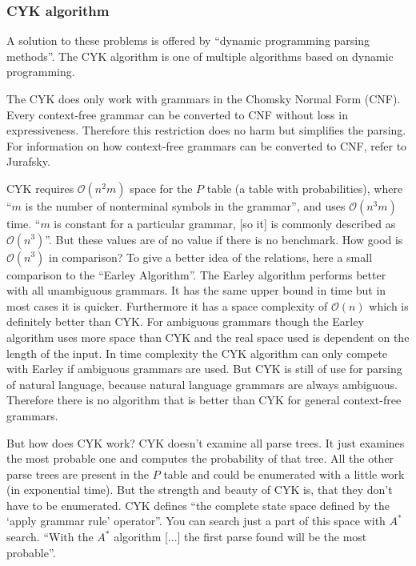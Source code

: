 \documentclass[12pt,twoside]{scrartcl}
\theoremstyle{plain}
\theoremstyle{definition}
\theoremstyle{remark}
\begin{document}
		\subsubsection*{CYK algorithm}
		\label{subSubSec:cykAlgorithm}		
		
		A solution to these problems is offered by ``dynamic programming parsing methods''\cite[p.~469]{Jurafsky2009b}. The CYK algorithm is one of multiple algorithms based on dynamic programming.
		
		The CYK does only work with grammars in the Chomsky Normal Form (CNF). Every context-free grammar can be converted to CNF without loss in expressiveness. Therefore this restriction does no harm but simplifies the parsing. For information on how context-free grammars can be converted to CNF, refer to Jurafsky\cite{Jurafsky2009b}.
		
		CYK requires $\mathcal{O}(n^{2}m)$ space for the $P$ table (a table with probabilities), where ``$m$ is the number of nonterminal symbols in the grammar''\cite[p.~893]{Russel2010}, and uses $\mathcal{O}(n^{3}m)$ time. ``$m$ is constant for a particular grammar, [so it] is commonly described as $\mathcal{O}(n^{3})$''\cite[p.~893]{Russel2010}. But these values are of no value if there is no benchmark. How good is $\mathcal{O}(n^{3})$ in comparison? To give a better idea of the relations, here a small comparison to the ``Earley Algorithm''\cite[p.~477]{Jurafsky2009b}. The Earley algorithm performs better with all unambiguous grammars.\cite{Li} It has the same upper bound in time but in most cases it is quicker. Furthermore it has a space complexity of $\mathcal{O}(n)$ which is definitely better than CYK.\cite{Li} For ambiguous grammars though the Earley algorithm uses more space than CYK and the real space used is dependent on the length of the input.\cite{Li} In time complexity the CYK algorithm can only compete with Earley if ambiguous grammars are used.\cite{Li} But CYK is still of use for parsing of natural language, because natural language grammars are always ambiguous. Therefore there is no algorithm that is better than CYK for general context-free grammars.\cite{Russel2010}
		
		But how does CYK work? CYK doesn't examine all parse trees. It just examines the most probable one and computes the probability of that tree. All the other parse trees are present in the $P$ table and could be enumerated with a little work (in exponential time). But the strength and beauty of CYK is, that they don't have to be enumerated. CYK defines ``the complete state space defined by the `apply grammar rule' operator''\cite[p.~894]{Russel2010}. You can search just a part of this space with $A^{*}$ search.\cite{Russel2010} ``With the $A^{*}$ algorithm [...] the first parse found will be the most probable''\cite[p.~895]{Russel2010}.
		
\end{document}
